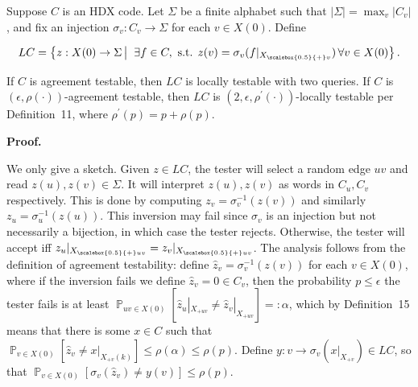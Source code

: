 Suppose $C$ is an HDX code. Let $\Sigma$ be a finite alphabet such that $\lvert\Sigma\rvert=\max_{v}\lvert C_{v}\rvert$, and fix an injection $\sigma_{v}:C_{v}\to\Sigma$ for each $v\in X(0)$. Define\par


\[\begin{gathered}
LC=\left\{z:X(0)\to\Sigma\left|\;\vphantom{z:X(0)\to\Sigma\exists f\in C,\hbox{ s.t. }z(v)=\sigma_{v}(f|_{{X}_{\scalebox{0.5}{+}v}})\,\forall v\in X(0)}\right.\exists f\in C,\hbox{ s.t. }z(v)=\sigma_{v}(f|_{{X}_{\scalebox{0.5}{+}v}})\,\forall v\in X(0)\right\}.
\end{gathered}\]


If $C$ is agreement testable, then $LC$ is locally testable with two queries. If $C$ is $(\epsilon,\rho(\cdot))$-agreement testable, then $LC$ is $(2,\epsilon,\rho^{\prime}(\cdot))$-locally testable per Definition 11, where $\rho^{\prime}(p)=p+\rho(p)$.\par







\par\medskip\noindent\textbf{
\textbf{Proof}.}\par




We only give a sketch. Given $z\in LC$, the tester will select a random edge $uv$ and read $z(u),z(v)\in\Sigma$. It will interpret $z(u),z(v)$ as words in $C_{u},C_{v}$ respectively. This is done by computing $z_{v}=\sigma_{v}^{-1}(z(v))$ and similarly $z_{u}=\sigma_{u}^{-1}(z(u))$. This inversion may fail since $\sigma_{v}$ is an injection but not necessarily a bijection, in which case the tester rejects. Otherwise, the tester will accept iff $z_{u}|_{{X}_{\scalebox{0.5}{+}uv}}=z_{v}|_{{X}_{\scalebox{0.5}{+}uv}}$. The analysis follows from the definition of agreement testability: define $\hat{z}_{v}=\sigma^{-1}_{v}(z(v))$ for each $v\in X(0)$, where if the inversion fails we define $\hat{z}_{v}=0\in C_{v}$, then the probability $p\leq\epsilon$ the tester fails is at least $\operatorname*{\mathbb{P}}_{uv\in X(0)}\left[\hat{z}_{u}|_{X_{+uv}}\not=\hat{z}_{v}|_{X_{+uv}}\right]=:\alpha$, which by Definition 15 means that there is some $x\in C$ such that $\operatorname*{\mathbb{P}}_{v\in X(0)}\left[\hat{z}_{v}\not=x|_{X_{+v}(k)}\right]\leq\rho(\alpha)\leq\rho(p)$. Define $y:v\rightarrow\sigma_{v}(x|_{X_{+v}})\in LC$, so that $\operatorname*{\mathbb{P}}_{v\in X(0)}\left[\sigma_{v}(\hat{z}_{v})\not=y(v)\right]\leq\rho(p)$.\par




